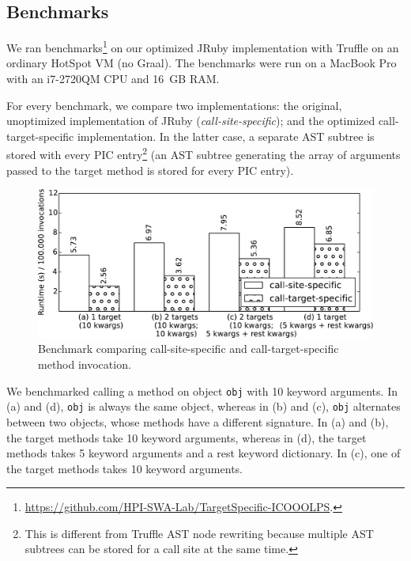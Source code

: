 \documentclass[10pt]{sigplanconf}
\begin{document}
\subsection{Benchmarks}
We ran benchmarks\footnote{\mbox{\url{https://github.com/HPI-SWA-Lab/TargetSpecific-ICOOOLPS}}.} on our optimized JRuby implementation with Truffle on an ordinary HotSpot VM (no Graal). The benchmarks were run on a MacBook Pro with an i7-2720QM CPU and 16~GB RAM.

For every benchmark, we compare two implementations: the original, unoptimized implementation of JRuby (\emph{call-site-specific}); and the optimized call-target-specific implementation. In the latter case, a separate AST subtree is stored with every PIC entry\footnote{This is different from Truffle AST node rewriting because multiple AST subtrees can be stored for a call site at the same time.} (an AST subtree generating the array of arguments passed to the target method is stored for every PIC entry).

\begin{figure}
\includegraphics[width=\linewidth]{resources/benchmark}
\caption{Benchmark comparing call-site-specific and call-target-specific method invocation.}
\label{fig:benchmark}
\end{figure}

We benchmarked calling a method on object \lstinline{obj} with 10 keyword arguments. In (a) and (d), \lstinline{obj} is always the same object, whereas in (b) and (c), \lstinline{obj} alternates between two objects, whose methods have a different signature. In (a) and (b), the target methods take 10 keyword arguments, whereas in (d), the target methods takes 5 keyword arguments and a rest keyword dictionary. In (c), one of the target methods takes 10 keyword arguments.
\end{document}
